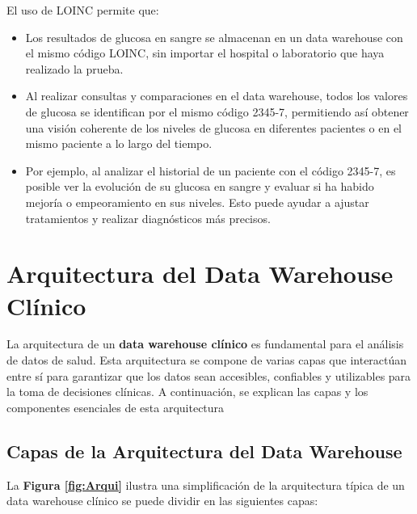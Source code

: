 \documentclass[12pt, a4paper, twoside]{article}
\begin{document}
	
	El uso de LOINC permite que:
	\begin{itemize}
		\item Los resultados de glucosa en sangre se almacenan en un data warehouse con el mismo código LOINC, sin importar el hospital o laboratorio que haya realizado la prueba.
		
		\item Al realizar consultas y comparaciones en el data warehouse, todos los valores de glucosa se identifican por el mismo código 2345-7, permitiendo así obtener una visión coherente de los niveles de glucosa en diferentes pacientes o en el mismo paciente a lo largo del tiempo.
		
		\item Por ejemplo, al analizar el historial de un paciente con el código 2345-7, es posible ver la evolución de su glucosa en sangre y evaluar si ha habido mejoría o empeoramiento en sus niveles. Esto puede ayudar a ajustar tratamientos y realizar diagnósticos más precisos.
	\end{itemize}
	
	
	
	\section{Arquitectura del Data Warehouse Clínico}
	
	La arquitectura de un \textbf{data warehouse clínico} es fundamental para el análisis de datos de salud. Esta arquitectura se compone de varias capas que interactúan entre sí para garantizar que los datos sean accesibles, confiables y utilizables para la toma de decisiones clínicas. A continuación, se explican las capas y los componentes esenciales de esta arquitectura
	
	\subsection{Capas de la Arquitectura del Data Warehouse}

	La \textbf{Figura \ref{fig:Arqui}} ilustra una simplificación de la arquitectura típica de un data warehouse clínico se puede dividir en las siguientes capas:
	
\end{document}
